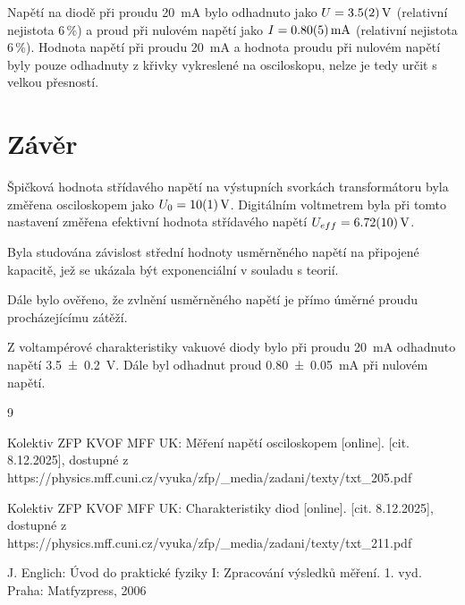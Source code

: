 \documentclass{../concepts/prepareprotokol} %
\begin{document}
Napětí na diodě při proudu \qty{20}{\milli\ampere} bylo odhadnuto jako $U = \qty{3.5\pm0.2}{V}$ (relativní nejistota 6\,\%) a proud při nulovém napětí jako $I = \qty{0.80\pm0.05}{\milli\ampere}$ (relativní nejistota 6\,\%). Hodnota napětí při proudu \qty{20}{\milli\ampere} a hodnota proudu při nulovém napětí byly pouze odhadnuty z křivky vykreslené na osciloskopu, nelze je tedy určit s velkou přesností. 

\section{Závěr}

Špičková hodnota střídavého napětí na výstupních svorkách transformátoru byla změřena osciloskopem jako $U_0 = \qty{10\pm1}{\volt}$. Digitálním voltmetrem byla při tomto nastavení změřena efektivní hodnota střídavého napětí $U_{eff} = \qty{6.72\pm0.10}{V}$.

Byla studována závislost střední hodnoty usměrněného napětí na připojené kapacitě, jež se ukázala být exponenciální v souladu s teorií.

Dále bylo ověřeno, že zvlnění usměrněného napětí je přímo úměrné proudu procházejícímu zátěží.

Z voltampérové charakteristiky vakuové diody bylo při proudu \qty{20}{mA} odhadnuto napětí \qty{3.5 \pm 0.2}{V}. Dále byl odhadnut proud \qty{0.80 \pm 0.05}{\milli\ampere} při nulovém napětí.


\begin{thebibliography}{9}

 Kolektiv ZFP KVOF MFF UK: Měření napětí osciloskopem [online]. [cit. 8.12.2025], dostupné z https://physics.mff.cuni.cz/vyuka/zfp/\_media/zadani/texty/txt\_205.pdf

 Kolektiv ZFP KVOF MFF UK: Charakteristiky diod [online]. [cit. 8.12.2025], dostupné z https://physics.mff.cuni.cz/vyuka/zfp/\_media/zadani/texty/txt\_211.pdf

 J. Englich: Úvod do praktické fyziky I: Zpracování výsledků měření. 1. vyd. Praha: Matfyzpress, 2006

\end{thebibliography}
\end{document}
